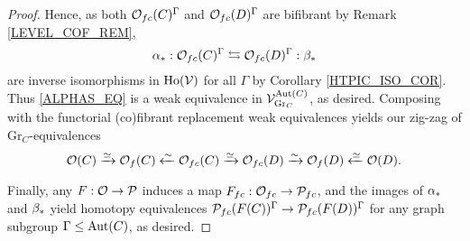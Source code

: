 \documentclass[a4paper,10pt
,draft
]{article}%
\renewcommand{\1}{\eta}%
\begin{document}
\begin{proof}
      Hence, as both $\O_{f c}(C)^\Gamma$ and $\O_{f c}(D)^\Gamma$ are bifibrant by Remark \ref{LEVEL_COF_REM},
      \[
            \alpha_{\**}: \O_{f c}(C)^\Gamma \leftrightarrows \O_{f c}(D)^\Gamma : \beta_{\**}
      \]
      are inverse isomorphisms in $\Ho(\V)$ for all $\Gamma$
      by Corollary \ref{HTPIC_ISO_COR}.
      Thus \eqref{ALPHAS_EQ} is a weak equivalence in $\V^{\Aut(C)}_{\mathrm{Gr}_C}$, as desired.
      Composing with the functorial (co)fibrant replacement weak equivalences yields our zig-zag of $\mathrm{Gr}_C$-equivalences
      \begin{equation}
            \O(C) \xrightarrow{\simeq} \O_f(C) \xleftarrow{\sim} \O_{f c}(C)
            \xrightarrow{\simeq}
            \O_{f c}(D) \xrightarrow{\sim} \O_f(D) \xleftarrow{\simeq} \O(D).
      \end{equation}
      
      Finally, any $F: \O \to \P$ induces a map $F_{f c}: \O_{f c} \to \P_{f c}$, and
      the images of $\alpha_{\**}$ and $\beta_{\**}$ yield
      homotopy equivalences $\P_{f c}(F(C))^\Gamma \to \P_{f c}(F(D))^\Gamma$ for any graph subgroup $\Gamma \leq \Aut(C)$,
      as desired.
\end{proof}
\end{document}
